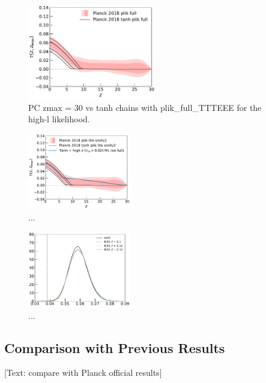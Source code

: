 \documentclass[prd,twocolumn,amsmath,amssymb,floatfix,superscriptaddress,nofootinbib]{revtex4-1}
\begin{document}
\begin{figure}[ht]
\includegraphics[width=0.5\textwidth]{results/direct_mcmc/pl18_plots_zmax30/plot_pub_tau_gtz_dz_0p1_pl18_pc_zmax30_plikfull_and_pl18_tanh_post_plikfull.pdf}
\caption{PC zmax = 30 vs tanh chains with plik\_full\_TTTEEE for the high-l likelihood.
}
\label{fig:}
\end{figure}


\begin{figure}
\includegraphics[width=0.40\textwidth]{plots/plot_tau_gtz.pdf}
\caption{...
}
\label{fig:}
\end{figure}


\begin{figure}
\includegraphics[width=0.40\textwidth]{plots/pl18_pc_zmax30_pliklite_srollv2_1015_tau_posterior_fraccov_1p0_burnin_10000_yes_norm_gaussian0p1_0p12_0p14.pdf}
\caption{...
}
\label{fig:}
\end{figure}


\subsection{Comparison with Previous Results}

[Text: compare with Planck official results]
\end{document}
